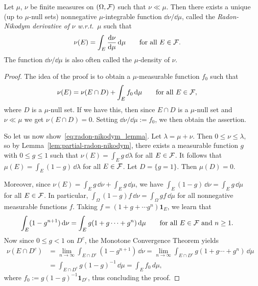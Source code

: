 \begin{theorem}\label{thm:radon-nikodym}
	Let $\mu$, $\nu$ be finite measures on $(\Omega,\mathcal F)$ such that $\nu\ll \mu$. Then there exists a unique (up to $\mu$-null sets) nonnegative $\mu$-integrable function $\dd\nu/\dd\mu$, called the \emph{Radon-Nikodym derivative of $\nu$ w.r.t.\ $\mu$} such that
	\[
		\nu(E) = \int_E \frac{\mathrm{d}\nu}{\mathrm{d}\mu}\,\mathrm{d}\mu\qquad\text{for all $E\in\mathcal F$}.
	\]
	The function $\dd\nu/\dd\mu$ is also often called the $\mu$-density of $\nu$.
\end{theorem}
\begin{proof}
	The idea of the proof is to obtain a $\mu$-measurable function $f_0$ such that
	\begin{equation}\label{eq:radon-nikodym_lemma}
		\nu(E) = \nu(E\cap D) + \int_E f_0\,\mathrm{d}\mu \qquad\text{for all $E\in\mathcal F$},
	\end{equation}
	where $D$ is a $\mu$-null set. If we have this, then since $E\cap D$ is a $\mu$-null set and $\nu\ll \mu$ we get $\nu(E\cap D)=0$. Setting $\dd\nu/\dd\mu:= f_0$, we then obtain the assertion.
	
	So let us now show~\eqref{eq:radon-nikodym_lemma}. Let $\lambda=\mu+\nu$. Then $0\le \nu\le \lambda$, so by Lemma~\ref{lem:partial-radon-nikodym}, there exists a measurable function $g$ with $0\le g\le 1$ such that $\nu(E)=\int_E g\,\dd\lambda$ for all $E\in\mathcal F$. It follows that
	$\mu(E) = \int_E (1-g)\,\dd\lambda$ for all $E\in\mathcal F$. Let $D=\{g=1\}$. Then $\mu(D) = 0$. 
	
	Moreover, since $\nu(E)=\int_E g\,\dd\nu + \int_E g\,\dd\mu$, we have $\int_E (1-g)\,\dd\nu = \int_E g\,\dd\mu$ for all $E\in\mathcal F$. In particular, $\int_\Omega (1-g)f\,\dd\nu = \int_\Omega gf\,\dd\mu$ for all nonnegative measurable functions $f$. Taking $f=(1+g +\cdots g^n)\mathbf{1}_E$, we learn that
	\[
		\int_E (1-g^{n+1})\,\mathrm{d}\nu = \int_E g(1+g\cdots+g^n)\,\mathrm{d}\mu\qquad\text{for all $E\in\mathcal F$ and $n\ge 1$}.
	\]
	Now since $0\le g <1$ on $D^c$, the Monotone Convergence Theorem yields
	\begin{align*}
		\nu(E\cap D^c) &= \lim_{n\to\infty} \int_{E\cap D^c} (1-g^{n+1})\,\dd\nu = \lim_{n\to\infty}\int_{E\cap D^c} g(1+g\cdots+g^n)\,\dd\mu \\
		&=\int_{E\cap D^c} g(1-g)^{-1}\,\dd\mu = \int_E f_0\,d\mu,
	\end{align*}
	where $f_0:= g(1-g)^{-1}\mathbf{1}_{D^c}$, thus concluding the proof.
\end{proof}



